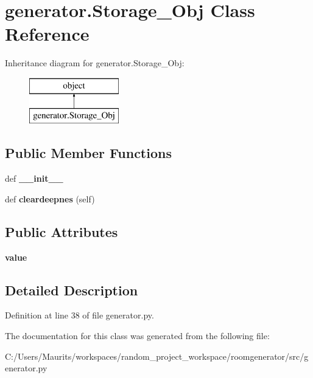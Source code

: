 \hypertarget{classgenerator_1_1_storage___obj}{}\section{generator.\+Storage\+\_\+\+Obj Class Reference}
\label{classgenerator_1_1_storage___obj}
Inheritance diagram for generator.\+Storage\+\_\+\+Obj\+:\begin{figure}[H]
\begin{center}
\leavevmode
\includegraphics[height=2.000000cm]{classgenerator_1_1_storage___obj}
\end{center}
\end{figure}
\subsection*{Public Member Functions}
\begin{DoxyCompactItemize}
\item 
\hypertarget{classgenerator_1_1_storage___obj_ada9cc751244a7774389e85e8c00fd6cf}{}def {\bfseries \+\_\+\+\_\+init\+\_\+\+\_\+}\label{classgenerator_1_1_storage___obj_ada9cc751244a7774389e85e8c00fd6cf}

\item 
\hypertarget{classgenerator_1_1_storage___obj_a48686084f3c1d3296df52e0ab2947ab0}{}def {\bfseries cleardeepnes} (self)\label{classgenerator_1_1_storage___obj_a48686084f3c1d3296df52e0ab2947ab0}

\end{DoxyCompactItemize}
\subsection*{Public Attributes}
\begin{DoxyCompactItemize}
\item 
\hypertarget{classgenerator_1_1_storage___obj_a0d61baccfdbbf4ff252675b833e17722}{}{\bfseries value}\label{classgenerator_1_1_storage___obj_a0d61baccfdbbf4ff252675b833e17722}

\end{DoxyCompactItemize}


\subsection{Detailed Description}


Definition at line 38 of file generator.\+py.



The documentation for this class was generated from the following file\+:\begin{DoxyCompactItemize}
\item 
C\+:/\+Users/\+Maurits/workspaces/random\+\_\+project\+\_\+workspace/roomgenerator/src/generator.\+py\end{DoxyCompactItemize}
